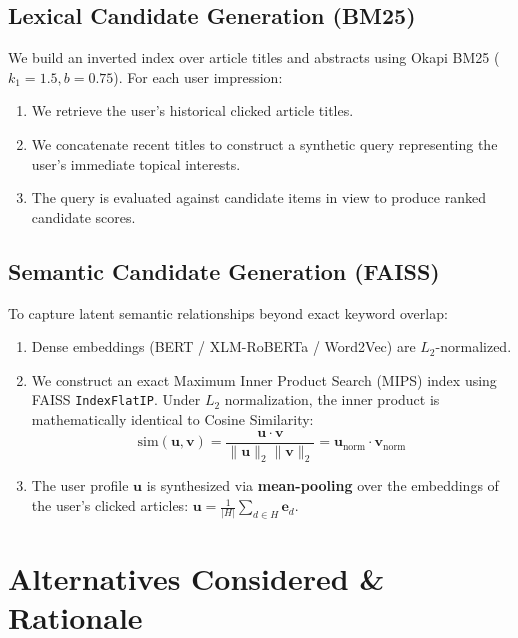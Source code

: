 \documentclass[10pt,twocolumn]{article}
\begin{document}
\subsection{Lexical Candidate Generation (BM25)}
We build an inverted index over article titles and abstracts using Okapi BM25 ($k_1=1.5, b=0.75$). For each user impression:
\begin{enumerate}
    \item We retrieve the user's historical clicked article titles.
    \item We concatenate recent titles to construct a synthetic query representing the user's immediate topical interests.
    \item The query is evaluated against candidate items in view to produce ranked candidate scores.
\end{enumerate}

\subsection{Semantic Candidate Generation (FAISS)}
To capture latent semantic relationships beyond exact keyword overlap:
\begin{enumerate}
    \item Dense embeddings (BERT / XLM-RoBERTa / Word2Vec) are $L_2$-normalized.
    \item We construct an exact Maximum Inner Product Search (MIPS) index using FAISS \texttt{IndexFlatIP}. Under $L_2$ normalization, the inner product is mathematically identical to Cosine Similarity:
    \begin{equation}
        \text{sim}(\mathbf{u}, \mathbf{v}) = \frac{\mathbf{u} \cdot \mathbf{v}}{\|\mathbf{u}\|_2 \|\mathbf{v}\|_2} = \mathbf{u}_{\text{norm}} \cdot \mathbf{v}_{\text{norm}}
    \end{equation}
    \item The user profile $\mathbf{u}$ is synthesized via \textbf{mean-pooling} over the embeddings of the user's clicked articles: $\mathbf{u} = \frac{1}{|H|} \sum_{d \in H} \mathbf{e}_d$.
\end{enumerate}

\section{Alternatives Considered \& Rationale}
\end{document}
